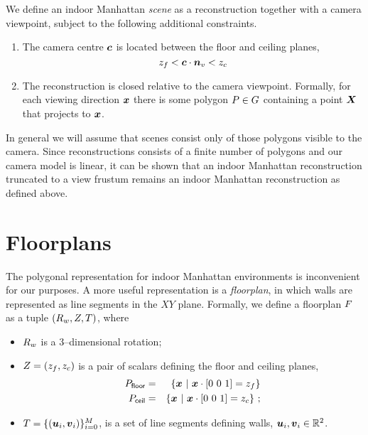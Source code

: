 We define an indoor Manhattan \textit{scene} as a reconstruction
together with a camera viewpoint, subject to the following additional
constraints.
\begin{enumerate}
  \item{The camera centre $\vect{c}$ is located between the floor
    and ceiling planes,
    \begin{equation}
      \zfloor < \vect{c} \cdot \vertnormal < \zceil
    \end{equation}
  }
  \item{The reconstruction is closed relative to the camera
    viewpoint. Formally, for each viewing direction $\vect{x}$ there
    is some polygon $\Poly\in\Reconstruction$ containing a point
    $\vect{X}$ that projects to $\vect{x}$.
  }
\end{enumerate}

In general we will assume that scenes consist only of those polygons
visible to the camera. Since reconstructions consists of a finite
number of polygons and our camera model is linear, it can be shown
that an indoor Manhattan reconstruction truncated to a view
frustum remains an indoor Manhattan reconstruction as defined
above.

\section{Floorplans}

The polygonal representation for indoor Manhattan environments is
inconvenient for our purposes. A more useful representation is a
\textit{floorplan}, in which walls are represented as line segments
in the $XY$ plane. Formally, we define a floorplan $\Floorplan$ as a
tuple $(\SceneR,\Zs,\Polyline)$, where
\begin{itemize}
  \item{$\SceneR$ is a 3--dimensional rotation;}
  \item{$\Zs=(\zfloor,\zceil)$ is a pair of scalars defining the floor
    and ceiling planes,
    \begin{eqnarray}
      \Pfloor &=& \{ \vect{x} ~|~ \vect{x} \cdot [0~0~1] = \zfloor \}\\
      \Pceil  &=& \{ \vect{x} ~|~ \vect{x} \cdot [0~0~1] = \zceil \} ~;
    \end{eqnarray}
  }
  \item{$\Polyline=\{(\startpt_i,\enpt_i)\}_{i=0}^M$, is a set of line
    segments defining walls, $\startpt_i,\enpt_i \in \Rtwo$.}
\end{itemize}

